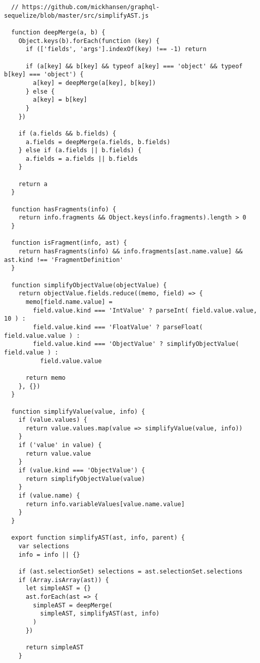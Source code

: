 \begin{verbatim}
  // https://github.com/mickhansen/graphql-sequelize/blob/master/src/simplifyAST.js

  function deepMerge(a, b) {
    Object.keys(b).forEach(function (key) {
      if (['fields', 'args'].indexOf(key) !== -1) return

      if (a[key] && b[key] && typeof a[key] === 'object' && typeof b[key] === 'object') {
        a[key] = deepMerge(a[key], b[key])
      } else {
        a[key] = b[key]
      }
    })

    if (a.fields && b.fields) {
      a.fields = deepMerge(a.fields, b.fields)
    } else if (a.fields || b.fields) {
      a.fields = a.fields || b.fields
    }

    return a
  }

  function hasFragments(info) {
    return info.fragments && Object.keys(info.fragments).length > 0
  }

  function isFragment(info, ast) {
    return hasFragments(info) && info.fragments[ast.name.value] && ast.kind !== 'FragmentDefinition'
  }

  function simplifyObjectValue(objectValue) {
    return objectValue.fields.reduce((memo, field) => {
      memo[field.name.value] =
        field.value.kind === 'IntValue' ? parseInt( field.value.value, 10 ) :
        field.value.kind === 'FloatValue' ? parseFloat( field.value.value ) :
        field.value.kind === 'ObjectValue' ? simplifyObjectValue( field.value ) :
          field.value.value

      return memo
    }, {})
  }

  function simplifyValue(value, info) {
    if (value.values) {
      return value.values.map(value => simplifyValue(value, info))
    }
    if ('value' in value) {
      return value.value
    }
    if (value.kind === 'ObjectValue') {
      return simplifyObjectValue(value)
    }
    if (value.name) {
      return info.variableValues[value.name.value]
    }
  }

  export function simplifyAST(ast, info, parent) {
    var selections
    info = info || {}

    if (ast.selectionSet) selections = ast.selectionSet.selections
    if (Array.isArray(ast)) {
      let simpleAST = {}
      ast.forEach(ast => {
        simpleAST = deepMerge(
          simpleAST, simplifyAST(ast, info)
        )
      })

      return simpleAST
    }


\end{verbatim}
